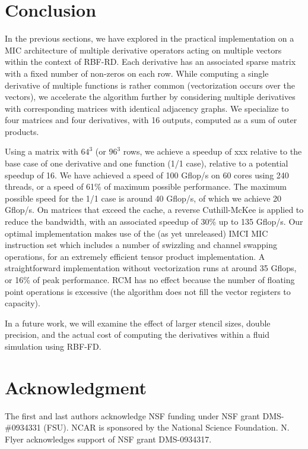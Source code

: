 \documentclass[10pt,conference,compsocconf]{IEEEtran}
\newcommand{\todo}[1]{{\color{red}\textbf{\hl{#1}}\xspace}}
\begin{document}
\section{Conclusion}
\label{sec:ccl}

In the previous sections, we have explored in the practical
implementation on a MIC architecture of multiple derivative operators
acting on multiple vectors within the context of RBF-RD. Each
derivative has an associated sparse matrix with a fixed number of
non-zeros on each row. While computing a single derivative of multiple
functions is rather common (vectorization occurs over the vectors), we
accelerate the algorithm further by considering multiple derivatives
with corresponding matrices with identical adjacency graphs. We
specialize to four matrices and four derivatives, with 16 outputs,
computed as a sum of outer products.

Using a matrix with $64^3$ (or $96^3$ rows, we achieve a speedup of
xxx relative to the base case of one derivative and one function (1/1
case), relative to a potential speedup of 16. We have achieved a
speed of 100 Gflop/s on 60 cores using 240 threads, or a speed of 61\% of
maximum possible performance. The maximum possible speed for the 1/1
case is around 40 Gflop/s, of which we achieve 20 Gflop/s. On matrices
that exceed the cache, a reverse Cuthill-McKee is applied to reduce the
bandwidth, with an associated speedup of 30\% up to 135 Gflop/s. Our
optimal implementation makes use of the (as yet unreleased) IMCI MIC instruction set 
which includes a number of swizzling and channel swapping operations, for an
extremely efficient tensor product implementation. A straightforward
implementation without vectorization runs at around 35 Gflops, or 16\% of peak
performance. RCM has no effect because the number of floating point
operations is excessive (the algorithm does not fill the vector
registers to capacity).

In a future work, we will examine the effect of larger stencil sizes,
double precision, and the actual cost of computing the derivatives
within a fluid simulation using RBF-FD.

\section*{Acknowledgment}
The first and last authors acknowledge NSF funding under NSF grant DMS-\#0934331 (FSU). 
NCAR is sponsored by the National Science Foundation. N. Flyer      
acknowledges support of NSF grant DMS-0934317.



\end{document}
